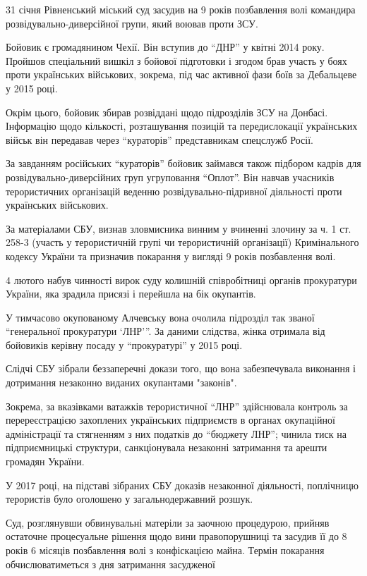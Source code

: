 31 січня Рівненський міський суд засудив на 9 років позбавлення волі командира
розвідувально-диверсійної групи, який воював проти ЗСУ.

Бойовик є громадянином Чехії. Він вступив до \enquote{ДНР} у квітні 2014 року.
Пройшов спеціальний вишкіл з бойової підготовки і згодом брав участь у боях
проти українських військових, зокрема, під час активної фази боїв за Дебальцеве
у 2015 році.

Окрім цього, бойовик збирав розвіддані щодо підрозділів ЗСУ на Донбасі.
Інформацію щодо кількості, розташування позицій та передислокації українських
військ він передавав через \enquote{кураторів} представникам спецслужб Росії.

За завданням російських \enquote{кураторів} бойовик займався також підбором
кадрів для розвідувально-диверсійних груп угруповання \enquote{Оплот}. Він
навчав учасників терористичних організацій веденню розвідувально-підривної
діяльності проти українських військових.

За матеріалами СБУ, визнав зловмисника винним у вчиненні злочину за ч. 1 ст.
258-3 (участь у терористичній групі чи терористичній організації) Кримінального
кодексу України та призначив покарання у вигляді 9 років позбавлення волі.

4 лютого набув чинності вирок суду колишній співробітниці органів прокуратури
України, яка зрадила присязі і перейшла на бік окупантів.

У тимчасово окупованому Алчевську вона очолила підрозділ так званої
\enquote{генеральної прокуратури \enquote{ЛНР}}. За даними слідства, жінка
отримала від бойовиків керівну посаду у \enquote{прокуратурі} у 2015 році.

Слідчі СБУ зібрали беззаперечні докази того, що вона забезпечувала виконання і
дотримання незаконно виданих окупантами "законів".

Зокрема, за вказівками ватажків терористичної \enquote{ЛНР} здійснювала
контроль за перереєстрацією захоплених українських підприємств в органах
окупаційної адміністрації та стягненням з них податків до \enquote{бюджету
ЛНР}; чинила тиск на підприємницькі структури, санкціонувала незаконні
затримання та арешти громадян України.

У 2017 році, на підставі зібраних СБУ доказів незаконної діяльності, поплічницю
терористів було оголошено у загальнодержавний розшук.

Суд, розглянувши обвинувальні матеріли за заочною процедурою, прийняв остаточне
процесуальне рішення щодо вини правопорушниці та засудив її до 8 років 6
місяців позбавлення волі з конфіскацією майна. Термін покарання
обчислюватиметься з дня затримання засудженої

